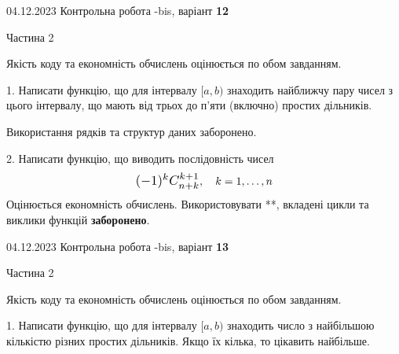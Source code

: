\documentclass[12pt, ukrainian]{article}
\begin{document}
{{{{{{{{{{{%
\begin {Huge}
{{04.12.2023 Контрольна робота -bis, варіант  \No \textbf { 12 }\par}}

\begin{center}Частина 2
\end{center}
\vspace{10mm}
\end {Huge}

{
\begin {Large}
Якість коду та економність обчислень оцінюється по обом завданням. 

\vspace{5mm}

1. Написати функцію, що для інтервалу $[a, b)$ знаходить найближчу пару чисел з цього інтервалу, що мають від трьох до п'яти (включно) простих дільників.

 Використання рядків та структур даних заборонено. 



\vspace{10mm}



2. 
Написати функцію, що виводить послідовність чисел
$$\scalebox{1.2}{$(-1)^{k}C_{n+k}^{k+1}$}, \quad k=1,\ldots,n$$
Оцінюється економність обчислень. Використовувати **, вкладені цикли та виклики функцій \textbf{заборонено}.

\end{Large}\newpage




\begin {Huge}
{{04.12.2023 Контрольна робота -bis, варіант  \No \textbf { 13 }\par}}

\begin{center}Частина 2
\end{center}
\vspace{10mm}
\end {Huge}

{
\begin {Large}
Якість коду та економність обчислень оцінюється по обом завданням. 

\vspace{5mm}

1. Написати функцію, що для інтервалу $[a, b)$ знаходить число з найбільшою кількістю різних простих дільників. Якщо їх кілька, то цікавить найбільше.


\end{Large}}}}}}}}}}}}}}
\end{document}

